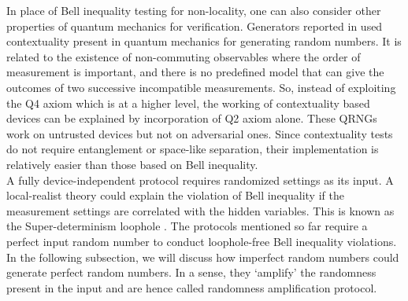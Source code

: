 \documentclass[]{interact}
\theoremstyle{plain}%
\theoremstyle{definition}
\theoremstyle{remark}
\begin{document}
In place of Bell inequality testing for non-locality, one can also consider other properties of quantum mechanics for verification. Generators reported in \cite{deng2013exploring,um2013experimental} used contextuality present in quantum mechanics  \cite{kochen1975problem} for generating random numbers.  It is related to the existence of non-commuting observables where the order of measurement is important, and there is no predefined model that can give the outcomes of two successive incompatible measurements. So, instead of exploiting the Q4 axiom which is at a higher level, the working of contextuality based devices can be explained by incorporation of Q2 axiom alone. These QRNGs work on untrusted devices but not on adversarial ones. Since contextuality tests do not require entanglement or space-like separation, their implementation is relatively easier than those based on Bell inequality. 
\\A fully device-independent protocol requires randomized settings as its input. A local-realist theory could explain the violation of Bell inequality if the measurement settings are correlated with the hidden variables. This is known as the Super-determinism loophole \cite{Larsson2014Oct}. The protocols mentioned so far require a perfect input random number to conduct loophole-free Bell inequality violations. In the following subsection, we will discuss how imperfect random numbers could generate perfect random numbers. In a sense, they `amplify' the randomness present in the input and are hence called randomness amplification protocol.
\end{document}
